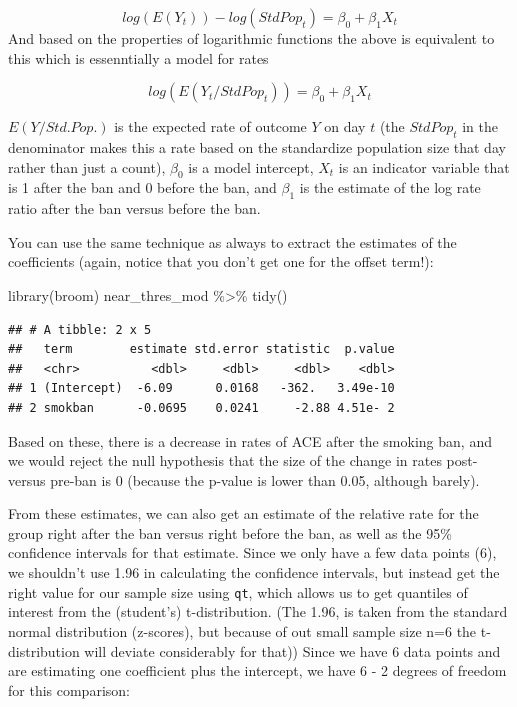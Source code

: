 \documentclass[
]{book}
\newenvironment{Shaded}{\begin{snugshade}}{\end{snugshade}}
\newcommand{\FunctionTok}[1]{\textcolor[rgb]{0.00,0.00,0.00}{#1}}
\newcommand{\NormalTok}[1]{#1}
\newcommand{\SpecialCharTok}[1]{\textcolor[rgb]{0.00,0.00,0.00}{#1}}
\begin{document}
\[
log(E(Y_t)) - log(StdPop_t) = \beta_0 + \beta_1 X_t 
\]
And based on the properties of logarithmic functions the above is equivalent to this which is essenntially a model for rates

\[
log(E(Y_t/StdPop_t)) = \beta_0 + \beta_1 X_t 
\]

\(E(Y/Std.Pop.)\) is the expected rate of outcome \(Y\) on day \(t\) (the \(StdPop_t\) in the denominator makes this a rate based on the standardize population size that day rather than just a count), \(\beta_0\) is a model intercept, \(X_t\) is an indicator variable that is 1 after the ban and 0 before the ban, and \(\beta_1\) is the estimate of the log rate ratio after the ban versus before the ban.

You can use the same technique as always to extract the estimates of the coefficients (again, notice that you don't get one for the offset term!):

\begin{Shaded}
\begin{Highlighting}[]
\FunctionTok{library}\NormalTok{(broom)}
\NormalTok{near\_thres\_mod }\SpecialCharTok{\%\textgreater{}\%} 
  \FunctionTok{tidy}\NormalTok{()}
\end{Highlighting}
\end{Shaded}

\begin{verbatim}
## # A tibble: 2 x 5
##   term        estimate std.error statistic  p.value
##   <chr>          <dbl>     <dbl>     <dbl>    <dbl>
## 1 (Intercept)  -6.09      0.0168   -362.   3.49e-10
## 2 smokban      -0.0695    0.0241     -2.88 4.51e- 2
\end{verbatim}

Based on these, there is a decrease in rates of ACE after the smoking ban, and we would reject the null hypothesis that the size of the change in rates post- versus pre-ban is 0 (because the p-value is lower than 0.05, although barely).

From these estimates, we can also get an estimate of the relative rate for the
group right after the ban versus right before the ban, as well as the 95\% confidence intervals for that estimate. Since we only have a few data points (6), we shouldn't use 1.96 in calculating the confidence intervals, but instead get the right value for our sample size using \texttt{qt}, which allows us to get quantiles of interest from the (student's) t-distribution. (The 1.96, is taken from the standard normal distribution (z-scores), but because of out small sample size n=6 the t-distribution will deviate considerably for that)) Since we have 6 data points and are estimating one coefficient plus the intercept, we have 6 - 2 degrees of freedom for this comparison:
\end{document}
